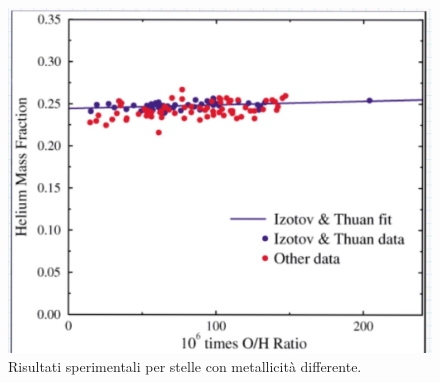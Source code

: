\begin{figure}[!h]
    \centering
    \includegraphics[scale=0.2]{Immagini/0315_heliummassfraction.png}
    \caption{Risultati sperimentali per stelle con metallicità differente.}
    \label{0315_Hefrac}
\end{figure}


